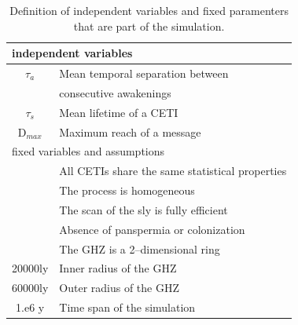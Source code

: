 \documentclass[crop]{CSLB}%
\begin{document}
 
\setlength{\tabcolsep}{10pt}
\begin{table}
\centering
\begin{tabular}{cl}
\hline
   \multicolumn{2}{l}{independent variables} \\
\hline
   $\tau_{a}$ & Mean temporal separation between\\
              & consecutive awakenings \\
   $\tau_{s}$ & Mean lifetime of a CETI \\
   D$_{max}$ & Maximum reach of a message \\
\hline
\multicolumn{2}{l}{fixed variables and assumptions} \\
\hline
   & All CETIs share the same statistical properties\\
   & The process is homogeneous \\
   & The scan of the sly is fully efficient\\
   & Absence of panspermia or colonization \\
   & The GHZ is a 2--dimensional ring \\
20000ly    & Inner radius of the GHZ \\
60000ly    & Outer radius of the GHZ \\
1.e6 y    & Time span of the simulation \\

\hline
\end{tabular}
\caption{Definition of independent variables and fixed paramenters 
   that are part of the simulation.}
\label{T_simu_hypotheses}
\end{table}
 
\end{document}
